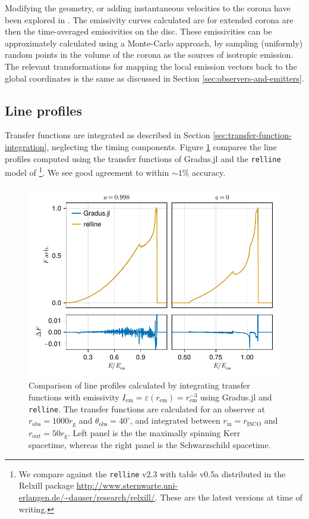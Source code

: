 \documentclass[fleqn,usenatbib]{mnras}
\newcommand{\Gradus}{Gradus.jl\xspace}
\newcommand{\relline}{\texttt{relline}\xspace}
\newcommand{\rg}{r_\text{g}}
\newcommand{\risco}{r_\text{ISCO}}
\begin{document}
Modifying the geometry, or adding instantaneous velocities to the corona have
been explored in \cite{gonzalez_probing_2017}. The emissivity curves calculated
are for extended corona are then the time-averaged emissivities on the disc.
These emissivities can be approximately calculated using a Monte-Carlo approach,
by sampling (uniformly) random points in the volume of the corona as the sources
of isotropic emission. The relevant transformations for mapping the local
emission vectors back to the global coordinates is the same as discussed in
Section \ref{sec:observers-and-emitters}.

\subsection{Line profiles}

Transfer functions are integrated as described in Section
\ref{sec:transfer-function-integration}, neglecting the timing components.
Figure \ref{fig:relline-comparison} compares the line profiles computed using
the transfer functions of \Gradus and the \relline model of
\cite{dauser_broad_2010}\footnote{We compare against the \relline v2.3 with
table v0.5a distributed in the Relxill package
\url{http://www.sternwarte.uni-erlangen.de/~dauser/research/relxill/}. These are
the latest versions at time of writing.}. We see good agreement to within $\sim
1\%$ accuracy.

\begin{figure}
	\centering
	\includegraphics[width=0.99\linewidth]{figures/lineprofiles.comparison.pdf}
	\caption{Comparison of line profiles calculated by integrating transfer functions with emissivity $I_\text{em} = \varepsilon(r_\text{em}) = r_\text{em}^{-3}$ using \Gradus and \relline. The transfer functions are calculated for an observer at $r_\text{obs} = 1000\rg$ and $\theta_\text{obs} = 40^\circ$, and integrated between $r_\text{in} = \risco$ and $r_\text{out} = 50 \rg$. Left panel is the the maximally spinning Kerr spacetime, whereas the right panel is the Schwarzschild spacetime.}
	\label{fig:relline-comparison}
\end{figure}
\end{document}
